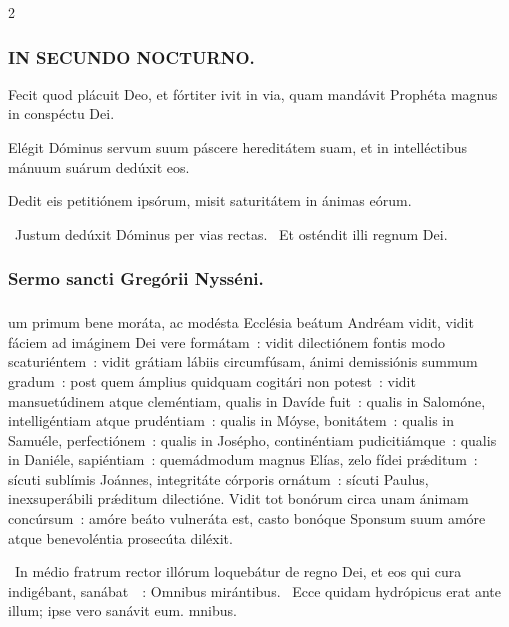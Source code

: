 \documentclass[9pt,twoside]{extarticle}
\begin{document}
\begin{multicols}{2}
{{\subsubsection*{\center \textsc{IN SECUNDO NOCTURNO.}}
\begin{tightlist}{}
\item {} Fecit quod plácuit Deo, et fórtiter ivit in via, quam mandávit Prophéta magnus in conspéctu Dei.
\item {} Elégit Dóminus servum suum páscere hereditátem suam, et in intelléctibus mánuum suárum dedúxit eos.
\item {} Dedit eis petitiónem ipsórum, misit saturitátem in ánimas eórum.
\item {}~Justum dedúxit Dóminus per vias rectas. ~Et osténdit illi regnum Dei.
\end{tightlist}

\subsubsection*{\center Sermo sancti Gregórii Nysséni.}
\subsubsection*{\center {}}
um primum bene moráta, ac modésta Ecclésia beátum Andréam vidit, vidit fáciem ad imáginem Dei vere formátam~: vidit dilectiónem fontis modo scaturiéntem~: vidit grátiam lábiis circumfúsam, ánimi demissiónis summum gradum~: post quem ámplius quidquam cogitári non potest~: vidit mansuetúdinem atque cleméntiam, qualis in Davíde fuit~: qualis in Salomóne, intelligéntiam atque prudéntiam~: qualis in Móyse, bonitátem~: qualis in Samuéle, perfectiónem~: qualis in Josépho, continéntiam pudicitiámque~: qualis in Daniéle, sapiéntiam~: quemádmodum magnus Elías, zelo fídei prǽditum~: sícuti sublímis Joánnes, integritáte córporis ornátum~: sícuti Paulus, inexsuperábili prǽditum dilectióne. Vidit tot bonórum circa unam ánimam concúrsum~: amóre beáto vulneráta est, casto bonóque Sponsum suum amóre atque benevoléntia prosecúta diléxit.

\begin{tightlist}{}
\item {}~In médio fratrum rector illórum loquebátur de regno Dei, et eos qui cura indigébant, sanábat~~: \textred{*} Omnibus mirántibus. ~Ecce quidam hydrópicus erat ante illum; ipse vero sanávit eum. mnibus.
\end{tightlist}

}}
\end{multicols}
\end{document}
